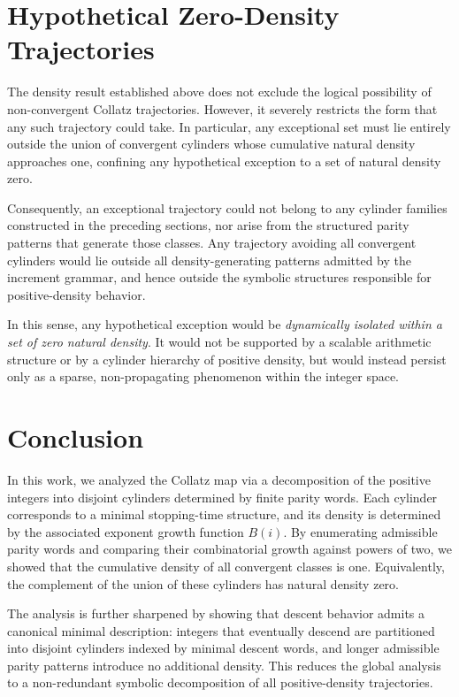 \documentclass[12pt, oneside]{article}   	%
\numberwithin{equation}{section}          %
\theoremstyle{definition}
\begin{document}
\section{Hypothetical Zero-Density Trajectories}

The density result established above does not exclude the logical possibility of
non-convergent Collatz trajectories. However, it severely restricts the form that
any such trajectory could take. In particular, any exceptional set must lie entirely
outside the union of convergent cylinders whose cumulative natural density
approaches one, confining any hypothetical exception to a set of natural density zero.

Consequently, an exceptional trajectory could not belong to any cylinder
families constructed in the preceding sections, nor arise from the structured parity
patterns that generate those classes. Any trajectory avoiding all convergent cylinders
would lie outside all density-generating patterns admitted by the increment grammar,
and hence outside the symbolic structures responsible for positive-density behavior.

In this sense, any hypothetical exception would be \emph{dynamically isolated within
a set of zero natural density}.  It would not be supported by a scalable arithmetic
structure or by a cylinder hierarchy of positive density, but would instead persist
only as a sparse, non-propagating phenomenon within the integer space.


\newpage
\section{Conclusion}

In this work, we analyzed the Collatz map via a decomposition of the positive integers
into disjoint cylinders determined by finite parity words. Each cylinder corresponds to
a minimal stopping-time structure, and its density is determined by the associated
exponent growth function $B(i)$. By enumerating admissible parity words and comparing
their combinatorial growth against powers of two, we showed that the cumulative density
of all convergent classes is one. Equivalently, the complement of the union of these
cylinders has natural density zero.

The analysis is further sharpened by showing that descent behavior admits a canonical
minimal description: integers that eventually descend are partitioned into disjoint
cylinders indexed by minimal descent words, and longer admissible parity patterns
introduce no additional density. This reduces the global analysis to a non-redundant
symbolic decomposition of all positive-density trajectories.
\end{document}
